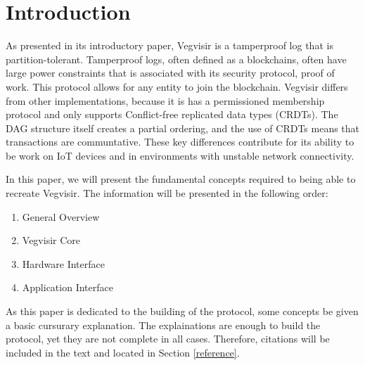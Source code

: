 \chapter*{Introduction}

As presented in its introductory paper\cite{karlsson2018vegvisir}, Vegvisir is
a tamperproof log that is partition-tolerant. Tamperproof logs, often defined
as a blockchains, often have large power constraints that is associated with
its security protocol, proof of work. This protocol allows for any entity to
join the blockchain. Vegvisir differs from other implementations, because it is
has a permissioned membership protocol and only supports Conflict-free
replicated data types (CRDTs). The DAG structure itself creates a partial
ordering, and the use of CRDTs means that transactions are communtative. These
key differences contribute for its ability to be work on IoT devices and in
environments with unstable network connectivity.

In this paper, we will present the fundamental concepts required to being able
to recreate Vegvisir. The information will be presented in the following order:
\begin{enumerate}
    \item General Overview
    \item Vegvisir Core
    \item Hardware Interface
    \item Application Interface
\end{enumerate}

As this paper is dedicated to the building of the protocol, some concepts be
given a basic cursurary explanation. The explainations are enough to build the
protocol, yet they are not complete in all cases. Therefore, citations will be
included in the text and located in Section \ref{reference}.
